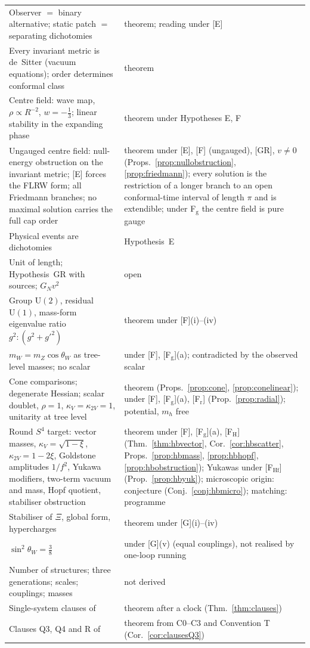 \documentclass[aps,pra,onecolumn,superscriptaddress,nofootinbib,10pt]{revtex4-2}
\theoremstyle{definition}
\theoremstyle{remark}
\newcommand{\U}{\mathrm{U}}
\begin{document}
\begin{table}[h]
\begin{tabular}{@{}p{}p{}@{}}
Observer $=$ binary alternative; static patch $=$ separating dichotomies & theorem; reading under [E]\\
Every invariant metric is de~Sitter (vacuum equations); order determines conformal class & theorem\\
Centre field: wave map, $\rho\propto R^{-2}$, $w=-\tfrac13$; linear stability in the expanding phase & theorem under Hypotheses E, F\\
Ungauged centre field: null-energy obstruction on the invariant metric; [E] forces the FLRW form; all Friedmann branches; no maximal solution carries the full cap order & theorem under [E], [F] (ungauged), [GR], $v\ne0$ (Props.~\ref{prop:nullobstruction}, \ref{prop:friedmann}); every solution is the restriction of a longer branch to an open conformal-time interval of length $\pi$ and is extendible; under F$_{\mathrm g}$ the centre field is pure gauge\\
Physical events are dichotomies & Hypothesis~E\\
Unit of length; Hypothesis~GR with sources; $G_Nv^2$ & open\\
Group $\U(2)$, residual $\U(1)$, mass-form eigenvalue ratio $g^2:(g^2+g'^2)$ & theorem under [F](i)--(iv)\\
$m_W=m_Z\cos\theta_W$ as tree-level masses; no scalar & under [F], [F$_{\mathrm g}$](a); contradicted by the observed scalar\\
Cone comparisons; degenerate Hessian; scalar doublet, $\rho=1$, $\kappa_V=\kappa_{2V}=1$, unitarity at tree level & theorem (Props.~\ref{prop:cone}, \ref{prop:conelinear}); under [F], [F$_{\mathrm g}$](a), [F$_{\mathrm r}$] (Prop.~\ref{prop:radial}); potential, $m_h$ free\\
Round $S^4$ target: vector masses, $\kappa_V=\sqrt{1-\xi}$, $\kappa_{2V}=1-2\xi$, Goldstone amplitudes $1/f^2$, Yukawa modifiers, two-term vacuum and mass, Hopf quotient, stabiliser obstruction & theorem under [F], [F$_{\mathrm g}$](a), [F$_{\mathrm H}$] (Thm.~\ref{thm:hbvector}, Cor.~\ref{cor:hbscatter}, Props.~\ref{prop:hbmass}, \ref{prop:hbhopf}, \ref{prop:hbobstruction}); Yukawas under [F$_{\mathrm{Hf}}$] (Prop.~\ref{prop:hbyuk}); microscopic origin: conjecture (Conj.~\ref{conj:hbmicro}); matching: programme\\
Stabiliser of $\Xi$, global form, hypercharges & theorem under [G](i)--(iv)\\
$\sin^2\theta_W=\tfrac38$ & under [G](v) (equal couplings), not realised by one-loop running\\
Number of structures; three generations; scales; couplings; masses & not derived\\
Single-system clauses of \cite{CRQO} & theorem after a clock (Thm.~\ref{thm:clauses})\\
Clauses \textsf{Q3}, \textsf{Q4} and R of \cite{CRQO} & theorem from C0--C3 and Convention T (Cor.~\ref{cor:clausesQ3})\\
\bottomrule
\end{tabular}
\end{table}
\end{document}
